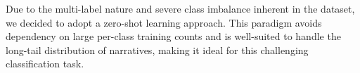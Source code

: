 Due to the multi-label nature and severe class imbalance inherent in the dataset, we decided to adopt a zero-shot learning approach. This paradigm avoids dependency on large per-class training counts and is well-suited to handle the long-tail distribution of narratives, making it ideal for this challenging classification task.








